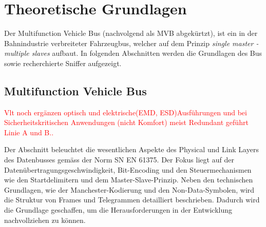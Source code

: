 



\chapter{Theoretische Grundlagen} %
\label{Chapter2TheoretischeGrundlagen} %
Der Multifunction Vehicle Bus (nachvolgend als MVB abgekürtzt), ist ein in der Bahnindustrie verbreiteter Fahrzeugbus, welcher auf dem Prinzip \textit{single master - multiple slaves} aufbaut. In folgenden Abschnitten werden die Grundlagen des Bus sowie recherchierte Sniffer aufgezeigt.


\section{Multifunction Vehicle Bus}

\textcolor{red}{Vlt noch ergänzen optisch und elektrische(EMD, ESD)Ausführungen und bei Sicherheitskritischen Anwendungen (nicht Komfort) meist Redundant geführt Linie A und B..}

Der Abschnitt beleuchtet die wesentlichen Aspekte des Physical und Link Layers des Datenbusses gemäss der Norm SN EN 61375. Der Fokus liegt auf der Datenübertragungsgeschwindigkeit, Bit-Encoding und den Steuermechanismen wie den Startdelimitern und dem Master-Slave-Prinzip. Neben den technischen Grundlagen, wie der Manchester-Kodierung und den Non-Data-Symbolen, wird die Struktur von Frames und Telegrammen detailliert beschrieben. Dadurch wird die Grundlage geschaffen, um die Herausforderungen in der Entwicklung nachvollziehen zu können.


